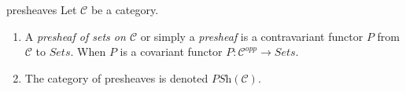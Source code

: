 \begin{frame}
\begin{block}{presheaves}
Let $\mathcal{C}$ be a category.
\begin{enumerate}
\item A {\it presheaf of sets on $\mathcal{C}$}
or simply a {\it presheaf} is a contravariant functor
$P$ from $\mathcal{C}$ to $\textit{Sets}$. When $P$ is a covariant functor $P : \mathcal{C}^{opp} \rightarrow \textit{Sets}$.
\item The category of presheaves is denoted $\textit{PSh}(\mathcal{C})$.
\end{enumerate}
\end{block}
\end{frame}